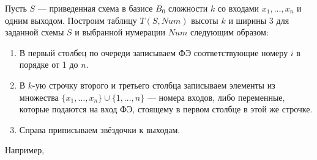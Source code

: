 Пусть $S$ --- приведенная схема в базисе $B_0$ сложности $k$ со входами $x_1, \ldots, x_n$ и одним выходом. Построим таблицу $T(S, Num)$ высоты $k$ и ширины 3 для заданной схемы $S$ и выбранной нумерации $Num$ следующим образом:
\begin{enumerate}[nolistsep]
    \item В первый столбец по очереди записываем ФЭ соответствующие номеру $i$ в порядке от 1 до $n$.
    \item В $k$-ую строчку второго и третьего столбца записываем элементы из множества $\{x_1, \ldots, x_n\} \cup \{1, \ldots, n\}$ --- номера входов, либо переменные, которые подаются на вход ФЭ, стоящему в первом столбце в этой же строчке.
    \item Справа приписываем звёздочки к выходам.
\end{enumerate}
Например,
